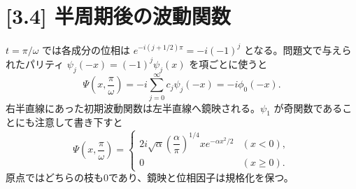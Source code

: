 \documentclass[11pt,a4paper]{article}
\begin{document}
\section*{[3.4] 半周期後の波動関数}
$t=\pi/\omega$ では各成分の位相は $e^{-i(j+1/2)\pi}=-i(-1)^j$ となる。問題文で与えられたパリティ $\psi_j(-x)=(-1)^j\psi_j(x)$ を項ごとに使うと
\[
\Psi\!\left(x,\frac\pi\omega\right)
=-i\sum_{j=0}^{\infty}c_j\psi_j(-x)
=-i\phi_0(-x).
\]
右半直線にあった初期波動関数は左半直線へ鏡映される。$\psi_1$ が奇関数であることにも注意して書き下すと
\[
\boxed{\Psi\!\left(x,\frac\pi\omega\right)=
\begin{cases}
2i\sqrt\alpha\left(\dfrac\alpha\pi\right)^{1/4}
x e^{-\alpha x^2/2} &(x<0),\\[2pt]
0 &(x\geq0).
\end{cases}}
\]
原点ではどちらの枝も0であり、鏡映と位相因子は規格化を保つ。
\end{document}
